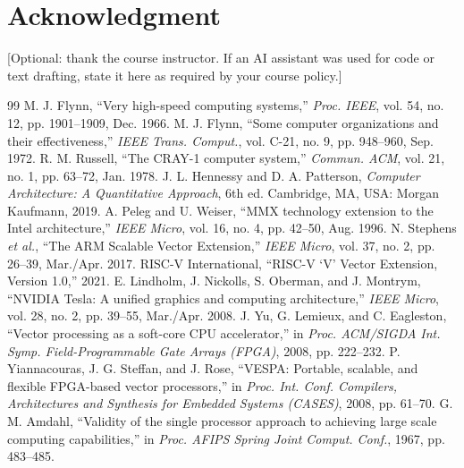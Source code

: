 \documentclass[conference]{IEEEtran}
\begin{document}
\section*{Acknowledgment}
[Optional: thank the course instructor. If an AI assistant was used for code or text drafting, state it here as required by your course policy.]

\begin{thebibliography}{99}
 M. J. Flynn, ``Very high-speed computing systems,'' \emph{Proc. IEEE}, vol. 54, no. 12, pp. 1901--1909, Dec. 1966.
 M. J. Flynn, ``Some computer organizations and their effectiveness,'' \emph{IEEE Trans. Comput.}, vol. C-21, no. 9, pp. 948--960, Sep. 1972.
 R. M. Russell, ``The CRAY-1 computer system,'' \emph{Commun. ACM}, vol. 21, no. 1, pp. 63--72, Jan. 1978.
 J. L. Hennessy and D. A. Patterson, \emph{Computer Architecture: A Quantitative Approach}, 6th ed. Cambridge, MA, USA: Morgan Kaufmann, 2019.
 A. Peleg and U. Weiser, ``MMX technology extension to the Intel architecture,'' \emph{IEEE Micro}, vol. 16, no. 4, pp. 42--50, Aug. 1996.
 N. Stephens \emph{et al.}, ``The ARM Scalable Vector Extension,'' \emph{IEEE Micro}, vol. 37, no. 2, pp. 26--39, Mar./Apr. 2017.
 RISC-V International, ``RISC-V `V' Vector Extension, Version 1.0,'' 2021.
 E. Lindholm, J. Nickolls, S. Oberman, and J. Montrym, ``NVIDIA Tesla: A unified graphics and computing architecture,'' \emph{IEEE Micro}, vol. 28, no. 2, pp. 39--55, Mar./Apr. 2008.
 J. Yu, G. Lemieux, and C. Eagleston, ``Vector processing as a soft-core CPU accelerator,'' in \emph{Proc. ACM/SIGDA Int. Symp. Field-Programmable Gate Arrays (FPGA)}, 2008, pp. 222--232.
 P. Yiannacouras, J. G. Steffan, and J. Rose, ``VESPA: Portable, scalable, and flexible FPGA-based vector processors,'' in \emph{Proc. Int. Conf. Compilers, Architectures and Synthesis for Embedded Systems (CASES)}, 2008, pp. 61--70.
 G. M. Amdahl, ``Validity of the single processor approach to achieving large scale computing capabilities,'' in \emph{Proc. AFIPS Spring Joint Comput. Conf.}, 1967, pp. 483--485.
\end{thebibliography}
\end{document}
